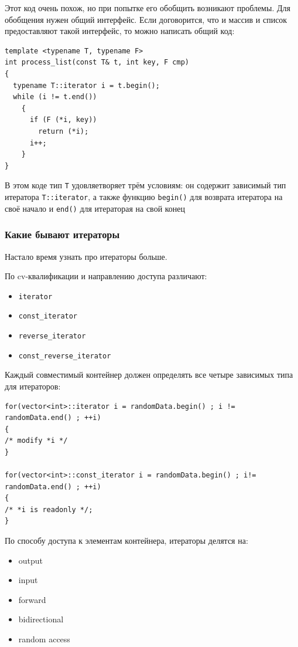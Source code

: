 \documentclass[a4paper,12pt,oneside]{article}
\begin{document}
Этот код очень похож, но при попытке его обобщить возникают проблемы. Для обобщения нужен общий интерфейс. Если договорится, что и массив и список предоставляют такой интерфейс, то можно написать общий код:

\begin{lstlisting}
template <typename T, typename F>
int process_list(const T& t, int key, F cmp)
{
  typename T::iterator i = t.begin();
  while (i != t.end())
    {
      if (F (*i, key)) 
        return (*i);
      i++;
    }  
}
\end{lstlisting}

В этом коде тип \lstinline!T! удовляетворяет трём условиям: он содержит зависимый тип итератора \lstinline!T::iterator!, а также функцию \lstinline!begin()! для возврата итератора на своё начало и \lstinline!end()! для итераторая на свой конец

\subsubsection{Какие бывают итераторы}\label{IterTypes}

Настало время узнать про итераторы больше. 

По cv-квалификации и направлению доступа различают:

\begin{itemize}
\item \lstinline!iterator!
\item \lstinline!const_iterator!
\item \lstinline!reverse_iterator!
\item \lstinline!const_reverse_iterator!
\end{itemize}

Каждый совместимый контейнер должен определять все четыре зависимых типа для итераторов:

\begin{lstlisting}
for(vector<int>::iterator i = randomData.begin() ; i != randomData.end() ; ++i)
{
/* modify *i */
}

for(vector<int>::const_iterator i = randomData.begin() ; i!= randomData.end() ; ++i) 
{
/* *i is readonly */;
}
\end{lstlisting}

По способу доступа к элементам контейнера, итераторы делятся на:

\begin {itemize}
\item output
\item input
\item forward
\item bidirectional
\item random access
\end {itemize}
\end{document}
